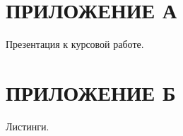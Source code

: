 \chapter*{ПРИЛОЖЕНИЕ А}

Презентация к курсовой работе.
\newpage
\chapter*{ПРИЛОЖЕНИЕ Б}

Листинги.


